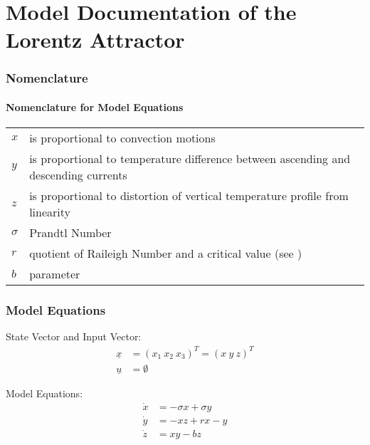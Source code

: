\documentclass[10pt,a4paper]{article}
\begin{document}
	\part*{Model Documentation of the \\ Lorentz Attractor} %
	
	
	\section{Nomenclature} %
	\subsection{Nomenclature for Model Equations} %
	
	\begin{tabular}{ll}
		$x$ & is proportional to convection motions \\
		$y$ & is proportional to temperature difference between ascending and descending currents\\
		$z$ & is proportional to distortion of vertical temperature profile from linearity\\
		$\sigma$ & Prandtl Number \\
		$r$ & quotient of Raileigh Number and a critical value (see \cite{LOR63})\\
		$b$ & parameter
	\end{tabular}
	
	
	\section{Model Equations} %
	State Vector and Input Vector:
	\begin{align*}
		\underline{x} &= (x_1 \ x_2 \ x_3)^T = (x \ y \ z )^T \\
		\underline{u} &= \emptyset
	\end{align*}

	\noindent Model Equations:
	\begin{subequations}
	\begin{align}
		\dot{x} &= -\sigma x + \sigma y 	\\      %
		\dot{y} &= -xz + rx - y 	\\
		\dot{z} &= xy - bz	
	\end{align}
	\end{subequations}
\end{document}
